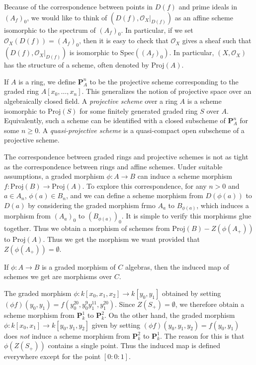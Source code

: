 Because of the correspondence between points in $D(f)$ and prime ideals in $(A_f)_0$, we would like to think of $(D(f),\mathcal{O}_X|_{D(f)})$ as an affine scheme isomorphic to the spectrum of $(A_f)_0$. In particular, if we set $\mathcal{O}_X(D(f)) = (A_f)_0$, then it is easy to check that $\mathcal{O}_X$ gives a sheaf such that $(D(f),\mathcal{O}_X|_{D(f)})$ is isomorphic to $\text{Spec}((A_f)_0)$. In particular, $(X,\mathcal{O}_X)$ has the structure of a scheme, often denoted by $\text{Proj}(A)$.

If $A$ is a ring, we define $\mathbf{P}^n_A$ to be the projective scheme corresponding to the graded ring $A[x_0,\dots,x_n]$. This generalizes the notion of projective space over an algebraically closed field. A \emph{projective scheme} over a ring $A$ is a scheme isomorphic to $\text{Proj}(S)$ for some finitely generated graded ring $S$ over $A$. Equivalently, such a scheme can be identified with a closed subscheme of $\mathbf{P}^n_A$ for some $n \geq 0$. A \emph{quasi-projective scheme} is a quasi-compact open subscheme of a projective scheme.

The correspondence between graded rings and projective schemes is not as tight as the correspondence between rings and affine schemes. Under suitable assumptions, a graded morphism $\phi: A \to B$ can induce a scheme morphism $f: \text{Proj}(B) \to \text{Proj}(A)$. To explore this correspondence, for any $n > 0$ and $a \in A_n$, $\phi(a) \in B_n$, and we can define a scheme morphism from $D(\phi(a))$ to $D(a)$ by considering the graded morphism frmo $A_a$ to $B_{\phi(a)}$, which induces a morphism from $(A_a)_0$ to $(B_{\phi(a)})_0$. It is simple to verify this morphisms glue together. Thus we obtain a morphism of schemes from $\text{Proj}(B) - Z(\phi(A_+))$ to $\text{Proj}(A)$. Thus we get the morphism we want provided that $Z(\phi(A_+)) = \emptyset$.

\begin{remark}
    If $\phi:A \to B$ is a graded morphism of $C$ algebras, then the induced map of schemes we get are morphisms over $C$.
\end{remark}

\begin{example}
    The graded morphism $\phi: k[x_0,x_1,x_2] \to k[y_0,y_1]$ obtained by setting $(\phi f)(y_0,y_1) = f(y_0^{20}, y_0^9 y_1^{11}, y_1^{20})$. Since $Z(S_+) = \emptyset$, we therefore obtain a scheme morphism from $\mathbf{P}^1_k$ to $\mathbf{P}^2_k$. On the other hand, the graded morphism $\phi: k[x_0,x_1] \to k[y_0,y_1,y_2]$ given by setting $(\phi f)(y_0,y_1,y_2) = f(y_0,y_1)$ does \emph{not} induce a scheme morphism from $\mathbf{P}^2_k$ to $\mathbf{P}^1_k$. The reason for this is that $\phi(Z(S_+))$ contains a single point. Thus the induced map is defined everywhere except for the point $[0:0:1]$.
\end{example}




